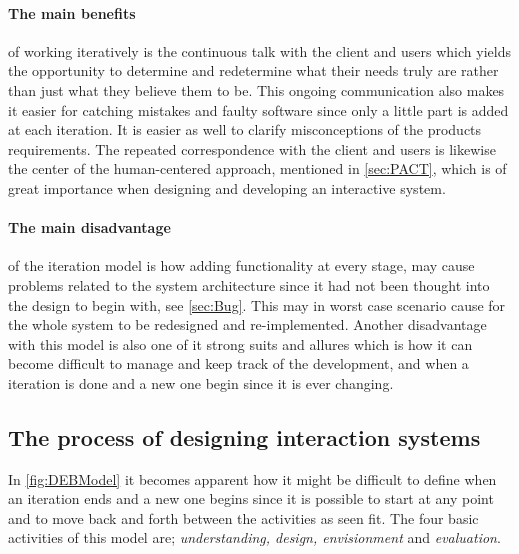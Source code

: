 \paragraph{The main benefits}
of working iteratively is the continuous talk with the client and users which yields the opportunity to determine and redetermine what their needs truly are rather than just what they believe them to be.
This ongoing communication also makes it easier for catching mistakes and faulty software since only a little part is added at each iteration.
It is easier as well to clarify misconceptions of the products requirements.%
The repeated correspondence with the client and users is likewise the center of the human-centered approach, mentioned in \cref{sec:PACT}, which is of great importance when designing and developing an interactive system.

\paragraph{The main disadvantage} of the iteration model is how adding functionality at every stage, may cause problems related to the system architecture since it had not been thought into the design to begin with, see \cref{sec:Bug}.
This may in worst case scenario cause for the whole system to be redesigned and re-implemented.
Another disadvantage with this model is also one of it strong suits and allures which is how it can become difficult to manage and keep track of the development, and when a iteration is done and a new one begin since it is ever changing.


\subsection{The process of designing interaction systems}\label{sec:Iterative1}
In \cref{fig:DEBModel} it becomes apparent how it might be difficult to define when an iteration ends and a new one begins since it is possible to start at any point and to move back and forth between the activities as seen fit.
The four basic activities of this model are; \textit{understanding, design, envisionment} and \textit{evaluation}.

